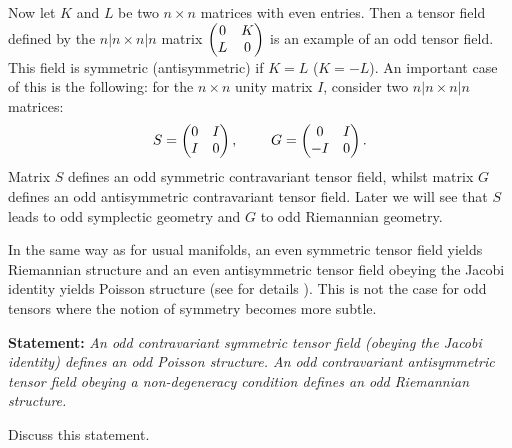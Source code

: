 \documentclass[12pt,reqno,a4paper]{amsart}
\theoremstyle{definition}
\begin{document}
Now let $K$ and $L$ be two $n\times n$ matrices with even entries. Then a
tensor field defined by the $n|n\times n|n$ matrix
           $
       \begin {pmatrix}
          0& K\cr L& 0
       \end {pmatrix}
                 $
is an example of an odd tensor field. This field is symmetric (antisymmetric)
if $K=L$ ($K=-L$). An important case of this is the following: for the $n\times  n$
 unity matrix $I$, consider two $n|n\times n|n$ matrices:
                   \begin{equation}\label{butin}
                             S=
       \begin {pmatrix}
           0 & I\cr I& 0
       \end {pmatrix},\qquad
     \   G=\begin {pmatrix}
           0 & I\cr -I& 0
       \end {pmatrix}.
                  \end{equation}
Matrix $S$ defines an odd symmetric contravariant tensor field, whilst
 matrix $G$ defines an odd antisymmetric contravariant tensor field. Later
  we will see that $S$ leads to odd symplectic geometry and $G$ to odd Riemannian geometry.

In the same way as for usual manifolds, an even symmetric tensor field
 yields Riemannian structure
and an even antisymmetric tensor field obeying the Jacobi identity yields
Poisson structure (see for details \cite{KhVor1}).
This is not the case for odd tensors where the notion of symmetry becomes
more subtle.

\smallskip

 {\bf Statement:}
{\it An odd contravariant symmetric tensor field (obeying the Jacobi identity)
defines an odd Poisson structure.
An odd contravariant antisymmetric tensor field obeying a non-degeneracy
condition defines an odd Riemannian structure.}

Discuss this statement.
\end{document}

